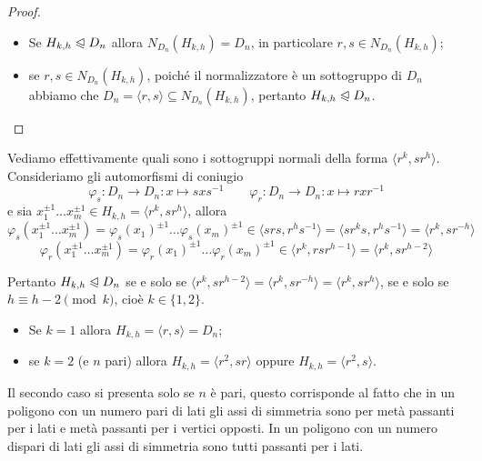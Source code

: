 \documentclass[11pt]{scrartcl}
\begin{document}
\begin{proof}~
    \begin{itemize}
        \item Se $H_{k, h}\trianglelefteqslant D_n$ allora $N_{D_n}(H_{k, h}) = D_n$, 
        in particolare $r, s \in N_{D_n}(H_{k, h})$;
        \item se $r, s \in N_{D_n}(H_{k, h})$, poiché il normalizzatore è un
        sottogruppo di $D_n$ abbiamo che $D_n = \langle r, s\rangle \subseteq
        N_{D_n}(H_{k, h})$, pertanto $H_{k, h} \trianglelefteqslant D_n$.
    \end{itemize}
\end{proof}

Vediamo effettivamente quali sono i sottogruppi normali della forma 
$\langle r^k, sr^h\rangle$. Consideriamo gli automorfismi di coniugio \[
    \varphi_s: D_n \longrightarrow D_n :x \longmapsto sxs^{-1}\qquad
    \varphi_r: D_n \longrightarrow D_n :x \longmapsto rxr^{-1}
\]e sia $x_1^{\pm 1}\ldots x_m^{\pm 1} \in H_{k, h} = \langle r^k, sr^h\rangle$, allora
\[
    \varphi_s(x_1^{\pm 1}\ldots x_m^{\pm 1}) = \varphi_s(x_1)^{\pm 1}\ldots \varphi_s(x_m)^{\pm 1}
    \in \langle srs, r^hs^{-1}\rangle = \langle sr^ks, r^hs^{-1}\rangle = \langle
    r^k, sr^{-h}\rangle
\]
\[
    \varphi_r(x_1^{\pm 1}\ldots x_m^{\pm 1}) = \varphi_r(x_1)^{\pm 1}\ldots \varphi_r(x_m)^{\pm 1}
    \in \langle r^k, rsr^{h - 1}\rangle = \langle r^k, sr^{h - 2}\rangle
\]

Pertanto $H_{k, h}\trianglelefteqslant D_n$ se e solo se $\langle r^k, sr^{h - 2}\rangle
= \langle r^k, sr^{-h}\rangle = \langle r^k, sr^h\rangle$, se e solo se 
$h \equiv h - 2 \pmod k$, cioè $k \in \{1, 2\}$.\begin{itemize}
    \item Se $k = 1$ allora $H_{k, h} = \langle r, s\rangle = D_n$;
    \item se $k = 2$ (e $n$ pari) allora $H_{k, h} = \langle r^2, sr\rangle$ oppure 
    $H_{k, h} = \langle r^2, s\rangle$.
\end{itemize}

\begin{remark}
    Il secondo caso si presenta solo se $n$ è pari, questo corrisponde al fatto 
    che in un poligono con un numero pari di lati gli assi di simmetria sono 
    per metà passanti per i lati e metà passanti per i vertici opposti. In un poligono con un numero dispari
    di lati gli assi di simmetria sono tutti passanti per i lati.
\end{remark}
\end{document}
